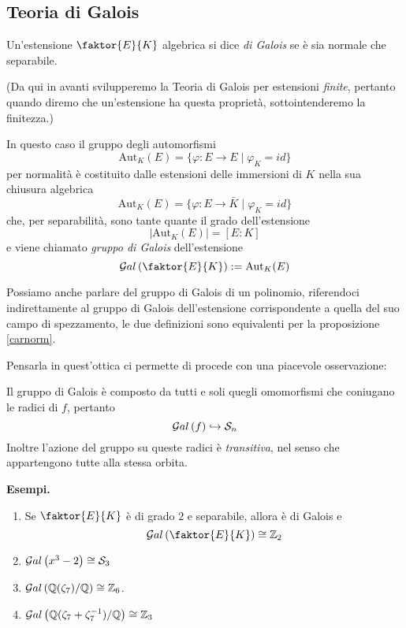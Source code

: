 \subsection{Teoria di Galois}
\begin{multicols}{2}
	
	\begin{definition}
		Un'estensione $ \faktor{E}{K} $ algebrica si dice \emph{di Galois} se è sia normale che separabile.
	\end{definition}
	
	(Da qui in avanti svilupperemo la Teoria di Galois per estensioni \emph{finite}, pertanto quando diremo che un'estensione ha questa proprietà, sottointenderemo la finitezza.)
	
	
	In questo caso il gruppo degli automorfismi 
	\[ \text{Aut}_K(E) = \{ \varphi : E \to E \mid \varphi_K = id \} \]
	per normalità è costituito dalle estensioni delle immersioni di $ K $ nella sua chiusura algebrica
	\[ \text{Aut}_K(E) = \{ \varphi : E \to \bar{K} \mid \varphi_K = id  \} \]
	che, per separabilità, sono tante quante il grado dell'estensione
	\[ |\text{Aut}_K(E)| = [E : K] \]
	e viene chiamato \emph{gruppo di Galois} dell'estensione
	\[ \Gal{\faktor{E}{K}} := \text{Aut}_K(E) \]
	
	Possiamo anche parlare del gruppo di Galois di un polinomio, riferendoci indirettamente al gruppo di Galois dell'estensione corrispondente a quella del suo campo di spezzamento, le due definizioni sono equivalenti per la proposizione \ref{carnorm}.
	
	Pensarla in quest'ottica ci permette di procede con una piacevole osservazione:
	\begin{remark}
		Il gruppo di Galois è composto da tutti e soli quegli omomorfismi che coniugano le radici di $ f $, pertanto
		\[ \mathcal{G}al\left( f \right) \hookrightarrow \mathcal{S}_n \]
		Inoltre l'azione del gruppo su queste radici è \emph{transitiva}, nel senso che appartengono tutte alla stessa orbita.
	\end{remark}
	
	\textbf{Esempi.}
	\begin{enumerate}
		\item Se $ \faktor{E}{K} $ è di grado $ 2 $ e separabile, allora è di Galois e
		\[ \Gal{\faktor{E}{K}} \cong \Z_2 \]
		\item $ \mathcal{G}al\left( x^3 -2 \right) \cong \mathcal{S}_3 $
		\item $ \mathcal{G}al\left( \mathbb{Q}(\zeta_7)/\mathbb{Q} \right) \cong \mathbb{Z}_6 $.
		\item $ \mathcal{G}al\left( \mathbb{Q}(\zeta_7+ \zeta_7^{-1})/\mathbb{Q} \right) \cong \mathbb{Z}_3 $
	\end{enumerate}
	

\end{multicols}
